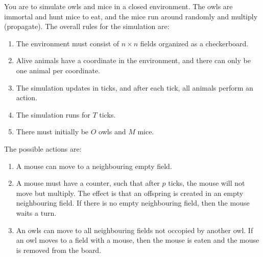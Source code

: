 You are to simulate owls and mice in a closed environment. The owls are immortal and hunt mice to eat, and the mice run around randomly and multiply (propagate). The overall rules for the simulation are:
\begin{enumerate}
\item The environment must consist of $n\times n$ fields organized as a checkerboard.
\item Alive animals have a coordinate in the environment, and there can only be one animal per coordinate.
\item The simulation updates in ticks, and after each tick, all animals perform an action.
\item The simulation runs for $T$ ticks.
\item There must initially be $O$ owls and $M$ mice.
\end{enumerate}
The possible actions are:
\begin{enumerate}[resume]
\item A mouse can move to a neighbouring empty field.
\item A mouse must have a counter, such that after $p$ ticks, the mouse will not move but multiply. The effect is that an offspring is created in an empty neighbouring field. If there is no empty neighbouring field, then the mouse waits a turn.
\item An owls can move to all neighbouring fields not occopied by another owl. If an owl moves to a field with a mouse, then the mouse is eaten and the mouse is removed from the board.
\end{enumerate}

